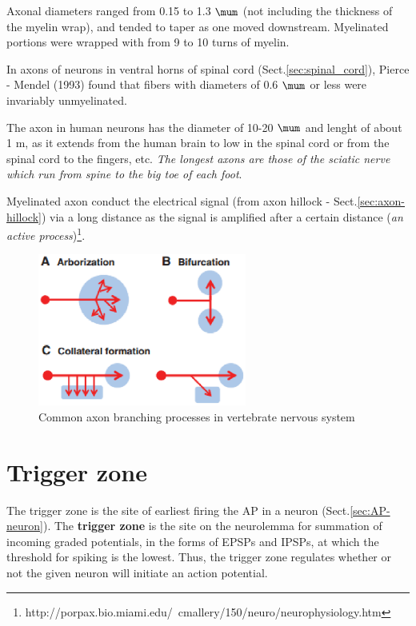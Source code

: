 Axonal diameters ranged from 0.15 to 1.3 $\mum$ (not including the thickness of
the myelin wrap), and tended to taper as one moved downstream.
Myelinated portions were wrapped with from 9 to 10 turns of myelin.

In axons of neurons in ventral horns of spinal cord
(Sect.\ref{sec:spinal_cord}), Pierce - Mendel (1993) found that fibers with
diameters of 0.6 $\mum$ or less were invariably unmyelinated.



The axon in human neurons has the diameter of  10-20 $\mum$ and lenght of about
1 m, as it extends from the human brain to low in the spinal cord or from the
spinal cord to the fingers, etc.
{\it The longest axons are those of the sciatic nerve which run from spine to
the big toe of each foot}.

Myelinated axon conduct the electrical signal (from axon hillock -
Sect.\ref{sec:axon-hillock}) via a long distance as the signal is amplified
after a certain distance ({\it an active
process})\footnote{http://porpax.bio.miami.edu/~cmallery/150/neuro/neurophysiology.htm}.

\begin{figure}[htb]
  \centerline{\includegraphics[height=5cm]{./images/axon_branching.eps}}
  \caption{Common axon branching processes in
  vertebrate nervous system \citep{gibson2011}}\label{fig:axon_branching}
\end{figure}

\section{Trigger zone}
\label{sec:AP-trigger-zone}
\label{sec:trigger-zone-AP}

The trigger zone is the  site of earliest firing the AP in a neuron
(Sect.\ref{sec:AP-neuron}). The {\bf trigger zone} is the site on the neurolemma
for summation of incoming graded potentials, in the forms of EPSPs and IPSPs, at
which the threshold for spiking is the lowest. Thus, the trigger zone regulates
whether or not the given neuron will initiate an action potential.

